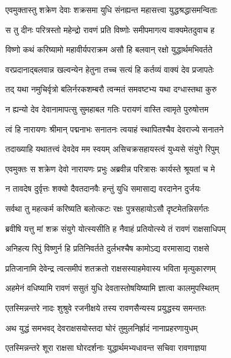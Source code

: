 \twolineshloka
{एवमुक्तास्तु शक्रेण देवाः शक्रसमा युधि}
{संनह्यन्त महासत्त्वा युद्धश्रद्धासमन्विताः} %

\twolineshloka
{स तु दीनः परित्रस्तो महेन्द्रो रावणं प्रति}
{विष्णोः समीपमागत्य वाक्यमेतदुवाच ह} %

\twolineshloka
{विष्णो कथं करिष्यामो महावीर्यपराक्रम}
{असौ हि बलवान् रक्षो युद्धार्थमभिवर्तते} %

\twolineshloka
{वरप्रदानाद्बलवान्न खल्वन्येन हेतुना}
{तच्च सत्यं हि कर्तव्यं वाक्यं देव प्रजापतेः} %

\twolineshloka
{तद् यथा नमुचिर्वृत्रो बलिर्नरकशम्बरौ}
{त्वन्मतं समवष्टभ्य यथा दग्धास्तथा कुरु} %

\twolineshloka
{न ह्यन्यो देव देवानामापत्सु सुमहाबल}
{गतिः परायणं वास्ति त्वामृते पुरुषोत्तम} %

\twolineshloka
{त्वं हि नारायणः श्रीमान् पद्मनाभः सनातनः}
{त्वयाहं स्थापितश्चैव देवराज्ये सनातने} %

\twolineshloka
{तदाख्याहि यथातत्त्वं देवदेव मम स्वयम्}
{असिचक्रसहायस्त्वं युध्यसे संयुगे रिपुम्} %

\twolineshloka
{एवमुक्तः स शक्रेण देवो नारायणः प्रभुः}
{अब्रवीन्न परित्रासः कार्यस्ते श्रूयतां च मे} %

\twolineshloka
{न तावदेष दुर्वृत्तः शक्यो दैवतदानवैः}
{हन्तुं युधि समासाद्य वरदानेन दुर्जयः} %

\twolineshloka
{सर्वथा तु महत्कर्म करिष्यति बलोत्कटः}
{रक्षः पुत्रसहायोऽसौ दृष्टमेतन्निसर्गतः} %

\twolineshloka
{ब्रवीषि यत्तु मां शक्र संयुगे योत्स्यसीति ह}
{नैवाहं प्रतियोत्स्ये तं रावणं राक्षसाधिपम्} %

\twolineshloka
{अनिहत्य रिपुं विष्णुर्न हि प्रतिनिवर्तते}
{दुर्लभश्चैष कामोऽद्य वरमासाद्य राक्षसे} %

\twolineshloka
{प्रतिजानामि देवेन्द्र त्वत्समीपं शतक्रतो}
{राक्षसस्याहमेवास्य भविता मृत्युकारणम्} %

\twolineshloka
{अहमेनं वधिष्यामि रावणं ससुतं युधि}
{देवतास्तोषयिष्यामि ज्ञात्वा कालमुपस्थितम्} %

\twolineshloka
{एतस्मिन्नन्तरे नादः शुश्रुवे रजनीक्षये}
{तस्य रावणसैन्यस्य प्रयुद्धस्य समन्ततः} %

\twolineshloka
{अथ युद्धं समभवद् देवराक्षसयोस्तदा}
{घोरं तुमुलनिर्ह्रादं नानाप्रहरणायुधम्} %

\twolineshloka
{एतस्मिन्नन्तरे शूरा राक्षसा घोरदर्शनाः}
{युद्धार्थमभ्यधावन्त सचिवा रावणाज्ञया} %


